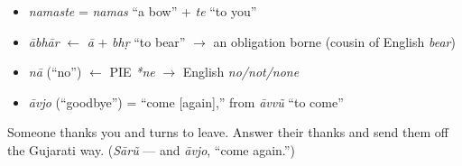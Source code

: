 \begin{grammarlens}[title={What you've built — roots you now carry}]
\begin{itemize}
\raggedright
  \item \emph{namaste} = \emph{namas} \textquotedblleft{}a bow\textquotedblright{} + \emph{te} \textquotedblleft{}to you\textquotedblright{}
  \item \emph{ābhār} $\leftarrow$ \emph{ā} + \emph{bhṛ} \textquotedblleft{}to bear\textquotedblright{} $\to$ an obligation borne (cousin of English \emph{bear})
  \item \emph{nā} (\textquotedblleft{}no\textquotedblright{}) $\leftarrow$ PIE \emph{*ne} $\to$ English \emph{no/not/none}
  \item \emph{āvjo} (\textquotedblleft{}goodbye\textquotedblright{}) = \textquotedblleft{}come {[}again{]},\textquotedblright{} from \emph{āvvũ} \textquotedblleft{}to come\textquotedblright{}
\end{itemize}
\end{grammarlens}

\begin{tcolorbox}[breakable,colback=teal!4,colframe=teal!35!black,title={Before you move on}]
Someone thanks you and turns to leave. Answer their thanks and send them off the Gujarati way. (\emph{Sārũ} — and \emph{āvjo}, \textquotedblleft{}come again.\textquotedblright{})
\end{tcolorbox}
